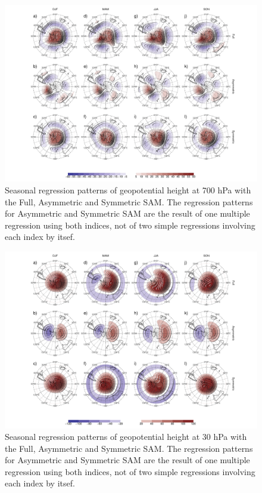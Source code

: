 \documentclass[]{ametsocV5}
\begin{document}
\begin{figure}
\includegraphics{2d-regr-700-1} \caption[Seasonal regression patterns of geopotential height at 700 hPa with the Full, Asymmetric and Symmetric SAM]{Seasonal regression patterns of geopotential height at 700 hPa with the Full, Asymmetric and Symmetric SAM. The regression patterns for Asymmetric and Symmetric SAM are the result of one multiple regression using both indices, not of two simple regressions involving each index by itsef.}\label{fig:2d-regr-700}
\end{figure}

\begin{figure}
\includegraphics{2d-regr-30-1} \caption[Seasonal regression patterns of geopotential height at 30 hPa with the Full, Asymmetric and Symmetric SAM]{Seasonal regression patterns of geopotential height at 30 hPa with the Full, Asymmetric and Symmetric SAM. The regression patterns for Asymmetric and Symmetric SAM are the result of one multiple regression using both indices, not of two simple regressions involving each index by itsef.}\label{fig:2d-regr-30}
\end{figure}
\end{document}
